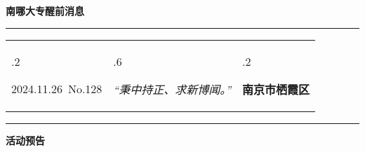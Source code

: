 \documentclass[letterpaper, 12pt]{article}
\begin{document}
\begin{center}
    \Huge\textbf{南哪大专醒前消息}
\end{center}
\vspace{4mm}
\hrule
\renewcommand\tabularxcolumn[1]{m{#1}}
\begin{tabularx}{\textwidth}{>{\hsize.2\hsize}X>{\hsize.6\hsize}X>{\hsize.2\hsize}X}
    \begin{flushleft}
        2024.11.26\, No.128
    \end{flushleft}
    &
    \begin{center}
        \textit{“秉中持正、求新博闻。”}
    \end{center}
    &
    \begin{flushright}
        \textbf{南京市栖霞区}
    \end{flushright}
\end{tabularx}
\vspace{-3.5mm}
\hrule
\vspace{4mm}
\centerline{\huge\textbf{活动预告}}
\end{document}

